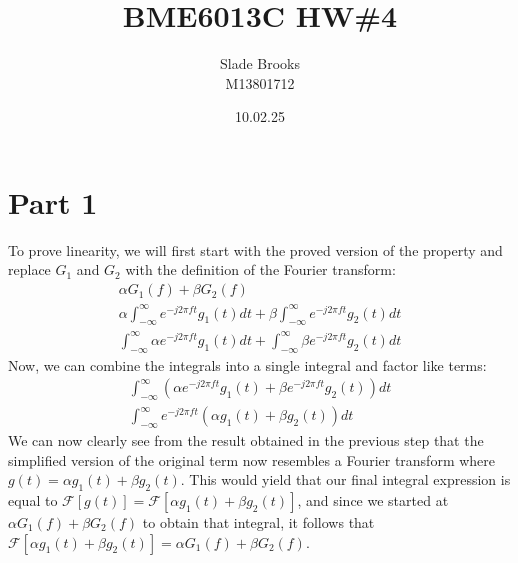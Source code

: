 \documentclass[12 pt]{article}
\title{BME6013C HW\#4}
\date{10.02.25}
\author{Slade Brooks \\ M13801712}
\begin{document}
\maketitle

\section*{Part 1}
To prove linearity, we will first start with the proved version of the property and replace $G_1$ and $G_2$ with the
definition of the Fourier transform:
\begin{align*}
    \alpha G_1(f) + \beta G_2(f) \\
    \alpha \int_{-\infty}^{\infty}e^{-j2\pi ft}g_1(t) dt + \beta \int_{-\infty}^{\infty}e^{-j2\pi ft}g_2(t) dt \\
    \int_{-\infty}^{\infty}\alpha e^{-j2\pi ft}g_1(t) dt +  \int_{-\infty}^{\infty}\beta e^{-j2\pi ft}g_2(t) dt
\end{align*}
Now, we can combine the integrals into a single integral and factor like terms:
\begin{align*}
    \int_{-\infty}^{\infty}\left(\alpha e^{-j2\pi ft}g_1(t) + \beta e^{-j2\pi ft}g_2(t)\right) dt \\
    \int_{-\infty}^{\infty}e^{-j2\pi ft}\left(\alpha g_1(t) + \beta g_2(t)\right) dt
\end{align*}
We can now clearly see from the result obtained in the previous step that the simplified version of the original term
now resembles a Fourier transform where $g(t)=\alpha g_1(t) + \beta g_2(t)$. This would yield that our final integral
expression is equal to $\mathcal{F}[g(t)]=\mathcal{F}[\alpha g_1(t) + \beta g_2(t)]$, and since we started at
$\alpha G_1(f) + \beta G_2(f)$ to obtain that integral, it follows that $\mathcal{F}[\alpha g_1(t) + \beta g_2(t)] =
\alpha G_1(f) + \beta G_2(f)$.
\end{document}
